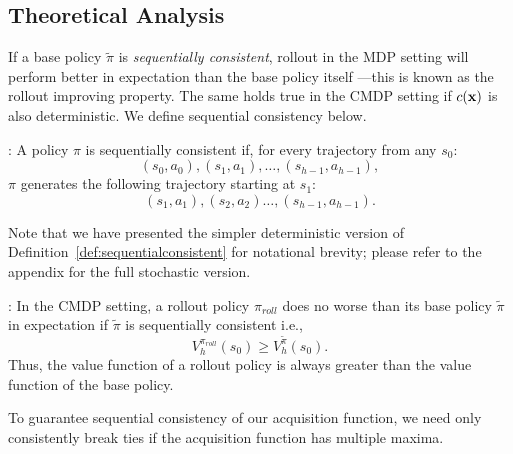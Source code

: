 \subsection{Theoretical Analysis}
If a base policy $\tilde \pi$ is \textit{sequentially consistent}, rollout in the MDP setting will perform better in expectation than the base policy itself ---this is known as the rollout improving property.
The same holds true in the CMDP setting if $c({\mathbf{x}})$ is also deterministic. We define sequential consistency below.

\begin{definition} \label{def:sequentialconsistent}
    \citep{bertsekas1995dynamic}: A policy $\pi$ is sequentially consistent if, for every trajectory from any $s_0$:
    \[
        (s_0, a_0), (s_1, a_1), \dots, (s_{h-1}, a_{h-1}),
    \]
    $\pi$ generates the following trajectory starting at $s_1$:
    \[
        (s_1, a_1), (s_2, a_2) \dots, (s_{h-1}, a_{h-1}).
    \]
\end{definition}
Note that we have presented the simpler deterministic version of Definition~\ref{def:sequentialconsistent} for notational brevity; please refer to the appendix for the full stochastic version.

\begin{theorem}\label{theorem:constrained_mdp_rollout}
    \citep{bertsekas2005rollout}:
    In the CMDP setting, a rollout policy $\pi_{roll}$ does no worse than its base policy $\tilde \pi$ in expectation if $\tilde \pi$ is sequentially consistent i.e.,
    \[
        V^{\pi_{roll}}_h(s_0) \geq V^{\tilde \pi}_h(s_0).
    \]
    Thus, the value function of a rollout policy is always greater than the value function of the base policy.
\end{theorem}
To guarantee sequential consistency of our acquisition function, we need only consistently break ties if the acquisition function has multiple maxima.
